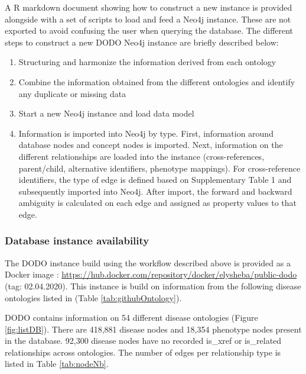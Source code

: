 \documentclass[9pt,a4paper,]{extarticle}
\begin{document}
A R markdown document showing how to construct a new instance is provided alongside with a set of scripts to load and feed a Neo4j instance. These are not exported to avoid confusing the user when querying the database. The different steps to construct a new DODO Neo4j instance are briefly described below:

\begin{enumerate}
\def\labelenumi{\arabic{enumi}.}
\item
  Structuring and harmonize the information derived from each ontology
\item
  Combine the information obtained from the different ontologies and identify any duplicate or missing data
\item
  Start a new Neo4j instance and load data model
\item
  Information is imported into Neo4j by type. First, information around database nodes and concept nodes is imported. Next, information on the different relationships are loaded into the instance (cross-references, parent/child, alternative identifiers, phenotype mappings). For cross-reference identifiers, the type of edge is defined based on Supplementary Table 1 and subsequently imported into Neo4j. After import, the forward and backward ambiguity is calculated on each edge and assigned as property values to that edge.
\end{enumerate}

\hypertarget{database-instance-availability}{%
\subsubsection{Database instance availability}\label{database-instance-availability}}

The DODO instance build using the workflow described above is provided as a Docker image \citep{Docker2019}: \url{https://hub.docker.com/repository/docker/elysheba/public-dodo} (tag: 02.04.2020). This instance is build on information from the following disease ontologies listed in (Table \ref{tab:githubOntology}).

DODO contains information on 54 different disease ontologies (Figure \ref{fig:listDB}). There are 418,881 disease nodes and 18,354 phenotype nodes present in the database. 92,300 disease nodes have no recorded is\_xref or is\_related relationships across ontologies. The number of edges per relationship type is listed in Table \ref{tab:nodeNb}.
\end{document}
